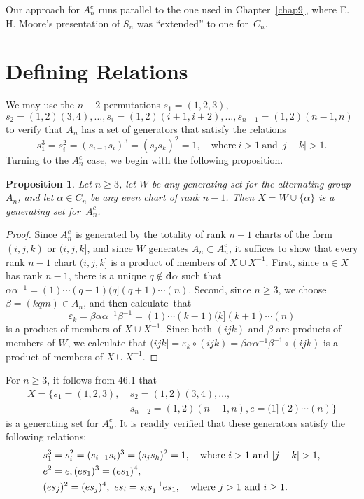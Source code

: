 \documentclass{surv-l}
\numberwithin{equation}{section}
\numberwithin{table}{section}
\numberwithin{figure}{section}
\newtheorem{proposition}[equation]{Proposition}
\theoremstyle{definition}
\begin{document}
Our approach for $A_{n}^{c}$ runs parallel to the one used in
Chapter~\ref{chap9}, where E. H. Moore's presentation of $S_{n}$
was ``extended'' to one for~$C_{n}$.

\setcounter{section}{45}

\section{Defining Relations}\label{sec10.46}

We may use the $n-2$ permutations $s_{1}=(1,2,3)$,
$s_{2}=(1,2)(3,4),\ldots, s_{i}=(1,2)(i+1, i+2),\ldots,
s_{n-1}=(1,2)(n-1, n)$ to verify that $A_{n}$ has a set of
generators that satisfy the relations
\[
s_{1}^{3}=s_{i}^{2}=(s_{i-1}s_{i})^{3}=(s_{j}s_{k})^{2}=1,\quad \mathrm{where}\
i>1\ \mathrm{and}\ |j-k|>1.
\]
Turning to the $A_{n}^{c}$ case, we begin with the following
proposition.

\begin{proposition}\label{prop10.46.1}
Let $n \geq 3$, let $W$ be any generating set for the alternating
group $A_{n}$, and let $\alpha\in C_{n}$ be any even chart of rank
$n-1$. Then $X=W\cup\{\alpha\}$ is a generating set
for~$A_{n}^{c}$.
\end{proposition}

\begin{proof} Since $A_{n}^{c}$ is generated by the totality of rank $n-1$
charts of the form $(i,j, k)$ or $(i,j, k]$, and since $W$
generates $A_{n}\subset A_{n}^{c}$, it suffices to show that every
rank $n-1$ chart $(i,j,k]$ is a product of members of $X\cup
X^{-1}$. First, since $\alpha\in X$ has rank $n-1$, there is a
unique $q\not\in \mathbf{d}\alpha$ such that
$\alpha\alpha^{-1}=(1)\cdots(q-1)(q](q+1)\cdots(n)$. Second, since
$n\geq 3$, we choose $\beta=(kqm)\in A_{n}$, and then
calculate~that
\[
\varepsilon_{k}=\beta\alpha\alpha^{-1}\beta^{-1}=(1)\cdots(k-1)(k](k+1)\cdots(n)
\]
is a product of members of $X\cup X^{-1}$. Since both $(ijk)$ and
$\beta$ are products of members of $W$, we calculate that
$(ijk]=\varepsilon_{k}\circ
(ijk)=\beta\alpha\alpha^{-1}\beta^{-1}\circ (ijk)$ is a product of
members of $X\cup X^{-1}.$
\end{proof}

For $n \geq 3$, it follows from 46.1 that
\begin{align*}
X=\{s_{1}=(1,2,3),\ &s_{2}=(1,2)(3,4),\ldots, \\
&s_{n-2} =(1,2)(n-1, n), e=(1](2)\cdots(n)\}
\end{align*}
is a generating set for $A_{n}^{c}$. It is readily verified that
these generators satisfy the following relations:
\begin{align}
&s_{1}^{3} =s_{i}^{2}=(s_{i-1}s_{i})^{3}=(s_{j}s_{k})^{2}=1,\quad \mathrm{where}\
i>1\ \mathrm{and}\ |j-k|>1, \notag \\
& e^{2} =e, (es_{1})^{3}=(es_{1})^{4}, \label{eq10.46.2} \\
&(es_{j})^{2}=(es_{j})^{4},\ es_{i}=s_{i}s_{1}^{-1}es_{1},\quad \mathrm{where}\
j>1\ \mathrm{and}\ i\geq 1. \notag
\end{align}
\end{document}
